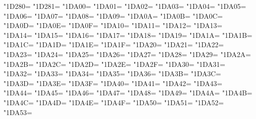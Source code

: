 \XeTeXcharclass"1D280=\KclassCM
\XeTeXcharclass"1D281=\KclassCM
\XeTeXcharclass"1DA00=\KclassCM
\XeTeXcharclass"1DA01=\KclassCM
\XeTeXcharclass"1DA02=\KclassCM
\XeTeXcharclass"1DA03=\KclassCM
\XeTeXcharclass"1DA04=\KclassCM
\XeTeXcharclass"1DA05=\KclassCM
\XeTeXcharclass"1DA06=\KclassCM
\XeTeXcharclass"1DA07=\KclassCM
\XeTeXcharclass"1DA08=\KclassCM
\XeTeXcharclass"1DA09=\KclassCM
\XeTeXcharclass"1DA0A=\KclassCM
\XeTeXcharclass"1DA0B=\KclassCM
\XeTeXcharclass"1DA0C=\KclassCM
\XeTeXcharclass"1DA0D=\KclassCM
\XeTeXcharclass"1DA0E=\KclassCM
\XeTeXcharclass"1DA0F=\KclassCM
\XeTeXcharclass"1DA10=\KclassCM
\XeTeXcharclass"1DA11=\KclassCM
\XeTeXcharclass"1DA12=\KclassCM
\XeTeXcharclass"1DA13=\KclassCM
\XeTeXcharclass"1DA14=\KclassCM
\XeTeXcharclass"1DA15=\KclassCM
\XeTeXcharclass"1DA16=\KclassCM
\XeTeXcharclass"1DA17=\KclassCM
\XeTeXcharclass"1DA18=\KclassCM
\XeTeXcharclass"1DA19=\KclassCM
\XeTeXcharclass"1DA1A=\KclassCM
\XeTeXcharclass"1DA1B=\KclassCM
\XeTeXcharclass"1DA1C=\KclassCM
\XeTeXcharclass"1DA1D=\KclassCM
\XeTeXcharclass"1DA1E=\KclassCM
\XeTeXcharclass"1DA1F=\KclassCM
\XeTeXcharclass"1DA20=\KclassCM
\XeTeXcharclass"1DA21=\KclassCM
\XeTeXcharclass"1DA22=\KclassCM
\XeTeXcharclass"1DA23=\KclassCM
\XeTeXcharclass"1DA24=\KclassCM
\XeTeXcharclass"1DA25=\KclassCM
\XeTeXcharclass"1DA26=\KclassCM
\XeTeXcharclass"1DA27=\KclassCM
\XeTeXcharclass"1DA28=\KclassCM
\XeTeXcharclass"1DA29=\KclassCM
\XeTeXcharclass"1DA2A=\KclassCM
\XeTeXcharclass"1DA2B=\KclassCM
\XeTeXcharclass"1DA2C=\KclassCM
\XeTeXcharclass"1DA2D=\KclassCM
\XeTeXcharclass"1DA2E=\KclassCM
\XeTeXcharclass"1DA2F=\KclassCM
\XeTeXcharclass"1DA30=\KclassCM
\XeTeXcharclass"1DA31=\KclassCM
\XeTeXcharclass"1DA32=\KclassCM
\XeTeXcharclass"1DA33=\KclassCM
\XeTeXcharclass"1DA34=\KclassCM
\XeTeXcharclass"1DA35=\KclassCM
\XeTeXcharclass"1DA36=\KclassCM
\XeTeXcharclass"1DA3B=\KclassCM
\XeTeXcharclass"1DA3C=\KclassCM
\XeTeXcharclass"1DA3D=\KclassCM
\XeTeXcharclass"1DA3E=\KclassCM
\XeTeXcharclass"1DA3F=\KclassCM
\XeTeXcharclass"1DA40=\KclassCM
\XeTeXcharclass"1DA41=\KclassCM
\XeTeXcharclass"1DA42=\KclassCM
\XeTeXcharclass"1DA43=\KclassCM
\XeTeXcharclass"1DA44=\KclassCM
\XeTeXcharclass"1DA45=\KclassCM
\XeTeXcharclass"1DA46=\KclassCM
\XeTeXcharclass"1DA47=\KclassCM
\XeTeXcharclass"1DA48=\KclassCM
\XeTeXcharclass"1DA49=\KclassCM
\XeTeXcharclass"1DA4A=\KclassCM
\XeTeXcharclass"1DA4B=\KclassCM
\XeTeXcharclass"1DA4C=\KclassCM
\XeTeXcharclass"1DA4D=\KclassCM
\XeTeXcharclass"1DA4E=\KclassCM
\XeTeXcharclass"1DA4F=\KclassCM
\XeTeXcharclass"1DA50=\KclassCM
\XeTeXcharclass"1DA51=\KclassCM
\XeTeXcharclass"1DA52=\KclassCM
\XeTeXcharclass"1DA53=\KclassCM
